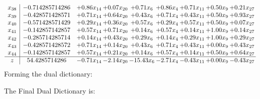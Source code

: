 \documentclass[8pt]{article}
\begin{document}
\[\begin{array}{c| c c@{\hskip 2pt} c@{\hskip 2pt} c@{\hskip 2pt} c@{\hskip 2pt} c@{\hskip 2pt} c@{\hskip 2pt} c@{\hskip 2pt} }
 x_{38}   &  -0.714285714286 & +  0.86 x_{14} & +  0.07 x_{20} & +  0.71 x_{6} & +  0.86 x_{4} & +  0.71 x_{11} & +  0.50 x_{9} & +  0.21 x_{27}\\
 x_{39}   &  -0.428571428571 & +  0.71 x_{14} & +  0.64 x_{20} & +  0.43 x_{6} & +  0.71 x_{4} & +  0.43 x_{11} & +  0.50 x_{9} & +  0.93 x_{27}\\
 x_{40}   &  -0.571428571429 & +  0.29 x_{14} & +  0.36 x_{20} & +  0.57 x_{6} & +  0.29 x_{4} & +  0.57 x_{11} & +  0.50 x_{9} & +  0.07 x_{27}\\
 x_{41}   &  -0.142857142857 & +  0.57 x_{14} & +  0.71 x_{20} & +  0.14 x_{6} & +  0.57 x_{4} & +  0.14 x_{11} & +  1.00 x_{9} & +  0.14 x_{27}\\
 x_{42}   &  -0.285714285714 & +  0.14 x_{14} & +  0.43 x_{20} & +  0.29 x_{6} & +  0.14 x_{4} & +  0.29 x_{11} & +  1.00 x_{9} & +  0.29 x_{27}\\
 x_{43}   &  -0.428571428572 & +  0.71 x_{14} & +  0.14 x_{20} & +  0.43 x_{6} & +  0.71 x_{4} & +  0.43 x_{11} & +  0.00 x_{9} & +  0.43 x_{27}\\
 x_{44}   &  -0.142857142857 & +  0.57 x_{14} & +  0.21 x_{20} & +  0.14 x_{6} & +  0.57 x_{4} & +  0.14 x_{11} & +  0.50 x_{9} & +  0.64 x_{27}\\
\hline
z    &  54.4285714286 & -0.71 x_{14} & -2.14 x_{20} & -15.43 x_{6} & -2.71 x_{4} & -0.43 x_{11} & +  0.00 x_{9} & -0.43 x_{27}\\
\end{array}\]
Forming the dual dictionary:

The Final Dual Dictionary is: 
\end{document}
